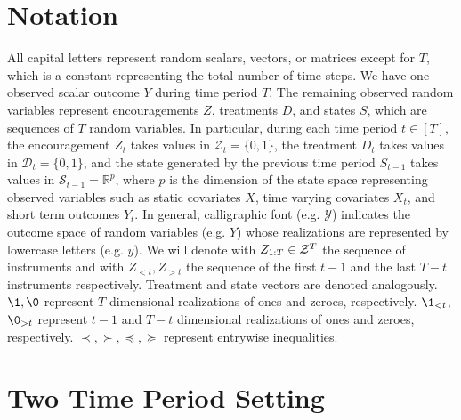 \section{Notation}
All capital letters represent random scalars, vectors, or matrices except for $T$, which is a constant representing the total number of time steps.
We have one observed scalar outcome $Y$ during time period $T$.
The remaining observed random variables represent encouragements $Z$, treatments $D$, and states $S$, which are sequences of $T$ random variables.
In particular, during each time period $t \in [T]$, the encouragement $Z_t$ takes values in $\mathcal{Z}_t = \{0,1\}$, the treatment $D_t$ takes values in $\mathcal{D}_t = \{0,1\}$, and the state generated by the previous time period $S_{t-1}$ takes values in $\mathcal{S}_{t-1} = \mathbb{R}^p$, where $p$ is the dimension of the state space representing observed variables such as static covariates $X$, time varying covariates $X_t$, and short term outcomes $Y_t$.
In general, calligraphic font (e.g. $\mathcal{Y}$) indicates the outcome space of random variables (e.g. $Y$) whose realizations are represented by lowercase letters (e.g. $y$).
We will denote with $Z_{1:T}\in {\cal Z}^T$ the sequence of instruments and with $Z_{<t}, Z_{>t}$ the sequence of the first $t-1$ and the last $T-t$ instruments respectively.
Treatment and state vectors are denoted analogously.
$\1, \0$ represent $T$-dimensional realizations of ones and zeroes, respectively. $\1_{<t}$, $\0_{>t}$ represent $t-1$ and $T-t$ dimensional realizations of ones and zeroes, respectively.
$\prec, \succ, \preceq, \succeq$ represent entrywise inequalities.

\section{Two Time Period Setting}

